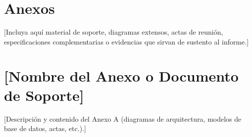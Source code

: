 \documentclass[10pt,letterpaper]{article}
\renewcommand{\thesection}{\arabic{section}.}
\begin{document}
\section{Anexos}

[Incluya aquí material de soporte, diagramas extensos, actas de reunión, especificaciones complementarias o evidencias que sirvan de sustento al informe.]

\appendix
\renewcommand{\thesection}{\Alph{section}.}

\section{[Nombre del Anexo o Documento de Soporte]}

[Descripción y contenido del Anexo A (diagramas de arquitectura, modelos de base de datos, actas, etc.).]

\end{document}
